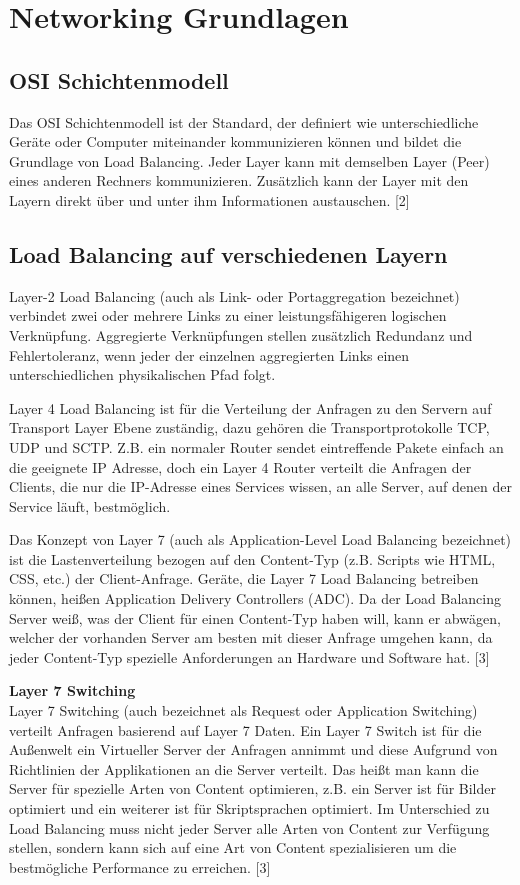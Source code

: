 \section{Networking Grundlagen}
\label{sec:Networking Grundlagen}

\subsection{OSI Schichtenmodell}
\label{sec:OSI Schichtenmodell}
Das OSI Schichtenmodell ist der Standard, der definiert wie unterschiedliche Geräte oder Computer miteinander kommunizieren können und bildet die Grundlage von Load Balancing. Jeder Layer kann mit demselben Layer (Peer) eines anderen Rechners kommunizieren. Zusätzlich kann der Layer mit den Layern direkt über und unter ihm Informationen austauschen. [2]

\subsection{Load Balancing auf verschiedenen Layern}
\label{sec:Load Balancing auf verschiedenen Layern}
Layer-2 Load Balancing (auch als Link- oder Portaggregation bezeichnet) verbindet zwei oder mehrere Links zu einer leistungsfähigeren logischen Verknüpfung. Aggregierte Verknüpfungen stellen zusätzlich Redundanz und Fehlertoleranz, wenn jeder der einzelnen aggregierten Links einen unterschiedlichen physikalischen Pfad folgt.

Layer 4 Load Balancing ist für die Verteilung der Anfragen zu den Servern auf Transport Layer Ebene zuständig, dazu gehören die Transportprotokolle TCP, UDP und SCTP. Z.B. ein normaler Router sendet eintreffende Pakete einfach an die geeignete IP Adresse, doch ein Layer 4 Router verteilt die Anfragen der Clients, die nur die IP-Adresse eines Services wissen, an alle Server,  auf denen der Service läuft, bestmöglich. 

Das Konzept von Layer 7 (auch als Application-Level Load Balancing bezeichnet) ist die Lastenverteilung bezogen auf den Content-Typ (z.B. Scripts wie HTML, CSS, etc.) der Client-Anfrage. Geräte, die Layer 7 Load Balancing betreiben können, heißen Application Delivery Controllers (ADC). Da der Load Balancing Server weiß,  was der Client  für einen Content-Typ haben will, kann er abwägen,  welcher der vorhanden Server am besten mit dieser Anfrage umgehen kann, da jeder Content-Typ spezielle Anforderungen an Hardware und Software hat. [3]

\textbf{Layer 7 Switching} \\
Layer 7 Switching (auch bezeichnet als Request oder Application Switching) verteilt Anfragen basierend auf Layer 7 Daten. Ein Layer 7 Switch ist für die Außenwelt ein Virtueller Server der Anfragen annimmt und diese Aufgrund von Richtlinien der Applikationen an die Server verteilt. Das heißt man kann die Server für spezielle Arten von Content optimieren, z.B. ein Server ist für Bilder optimiert und ein weiterer ist für Skriptsprachen optimiert. Im Unterschied zu Load Balancing muss nicht jeder Server alle Arten von Content zur Verfügung stellen, sondern kann sich auf eine Art von Content spezialisieren um die bestmögliche Performance zu erreichen. [3]

